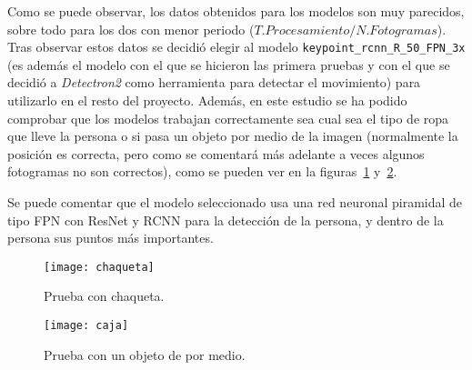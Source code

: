 {\begin{table}[h]
	\centering
\caption{Tabla con el estudio de los modelos de posición ordenado por ratio.}
\label{tab:modelos}
\end{table}

Como se puede observar, los datos obtenidos para los modelos son muy parecidos, sobre todo para los dos con menor periodo ($T. Procesamiento/N. Fotogramas$). Tras observar estos datos se decidió elegir al modelo \texttt{keypoint\_rcnn\_R\_50\_FPN\_3x} (es además el modelo con el que se hicieron las primera pruebas y con el que se decidió a \textit{Detectron2} como herramienta para detectar el movimiento) para utilizarlo en el resto del proyecto. Además, en este estudio se ha podido comprobar que los modelos trabajan correctamente sea cual sea el tipo de ropa que lleve la persona o si pasa un objeto por medio de la imagen (normalmente la posición es correcta, pero como se comentará más adelante a veces algunos fotogramas no son correctos), como se pueden ver en la figuras~\ref{fig:chaqueta} y~\ref{fig:caja}.

Se puede comentar que el modelo seleccionado usa una red neuronal piramidal de tipo FPN con ResNet y RCNN para la detección de la persona, y dentro de la persona sus puntos más importantes.

\begin{figure}[h]
	\centering
	\texttt{[image: chaqueta]}
	\caption{Prueba con chaqueta.}
	\label{fig:chaqueta}
\end{figure}

\begin{figure}[h]
	\centering
	\texttt{[image: caja]}
	\caption{Prueba con un objeto de por medio.}
	\label{fig:caja}
\end{figure}


}
